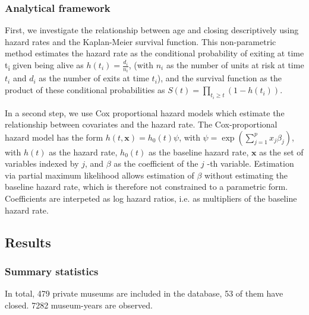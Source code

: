 \documentclass[11pt]{article}
\begin{document}
\subsubsection*{Analytical framework}



First, we investigate the relationship between age and closing descriptively using hazard rates and the Kaplan-Meier survival function.
This non-parametric method estimates the hazard rate as the conditional probability of exiting at time t\textsubscript{i} given being alive as \(h(t_i) = \frac{d_i}{n_i}\), (with \(n_i\) as the number of units at risk at time \(t_i\) and \(d_i\) as the number of exits at time \(t_i\)), and the survival function as the product of these conditional probabilities as \(S(t) = \prod_{t_i \geq t} \left(1-h(t_i) \right)\).



In a second step, we use Cox proportional hazard models which estimate the relationship between covariates and the hazard rate.
The Cox-proportional hazard model has the form \(h(t,\mathbf{x}) = h_0(t) \psi\), with \(\psi = \exp(\sum_{j=1}^p x_j \beta_j)\), with \(h(t)\) as the hazard rate, \(h_0(t)\) as the baseline hazard rate, \(\mathbf{x}\) as the set of variables indexed by \(j\), and \(\beta\) as the coefficient of the \(j\) -th variable.
Estimation via partial maximum likelihood allows estimation of \(\beta\) without estimating the baseline hazard rate, which is therefore not constrained to a parametric form. 
Coefficients are interpeted as log hazard ratios, i.e. as multipliers of the baseline hazard rate. 



\subsection*{Results}


\subsubsection*{Summary statistics}


In total, 479 private museums are included in the database, 53 of them have closed.
7282 museum-years are observed.

\noindent
\end{document}
